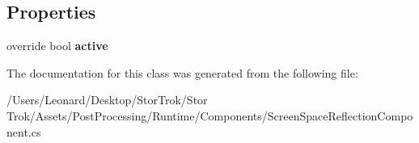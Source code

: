 \subsection*{Properties}
\begin{DoxyCompactItemize}
\item 
\mbox{\label{class_unity_engine_1_1_post_processing_1_1_screen_space_reflection_component_aa8700a0b57b1a9d4a9d928af7fb3fbad}} 
override bool {\bfseries active}
\end{DoxyCompactItemize}


The documentation for this class was generated from the following file\+:\begin{DoxyCompactItemize}
\item 
/\+Users/\+Leonard/\+Desktop/\+Stor\+Trok/\+Stor Trok/\+Assets/\+Post\+Processing/\+Runtime/\+Components/Screen\+Space\+Reflection\+Component.\+cs\end{DoxyCompactItemize}

